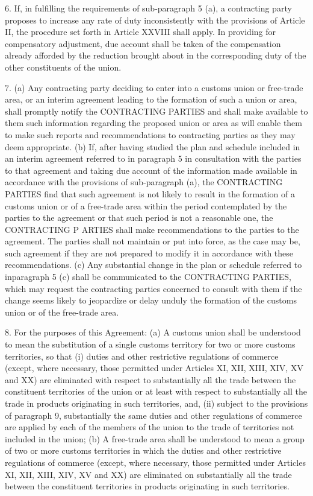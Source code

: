 \documentclass{nuevotema}
\begin{document}
6. If, in fulfilling the requirements of sub-paragraph 5 (a), a
contracting party proposes to increase any rate of duty inconsistently with
the provisions of Article II, the procedure set forth in Article XXVIII shall
apply. In providing for compensatory adjustment, due account shall be
taken of the compensation already afforded by the reduction brought
about in the corresponding duty of the other constituents of the union.

7. (a) Any contracting party deciding to enter into a customs
union or free-trade area, or an interim agreement leading to the formation
of such a union or area, shall promptly notify the CONTRACTING PARTIES
and shall make available to them such information regarding the
proposed union or area as will enable them to make such reports and
recommendations to contracting parties as they may deem appropriate.
(b) If, after having studied the plan and schedule included in an
interim agreement referred to in paragraph 5 in consultation with the
parties to that agreement and taking due account of the information made available in accordance with the provisions of sub-paragraph (a), the CONTRACTING PARTIES find that such agreement is not likely to result in the formation of a customs union or of a free-trade area within the period contemplated by the parties to the agreement or that such period is not a reasonable one, the CONTRACTING P ARTIES shall make recommendations to the parties to the agreement. The parties shall not maintain or put into force, as the case may be, such agreement if they are not prepared to modify it in
accordance with these recommendations. (c) Any substantial change in the plan or schedule referred to inparagraph 5 (c) shall be communicated to the CONTRACTING PARTIES, which may request the contracting parties concerned to consult with them if the change seems likely to jeopardize or delay unduly the formation of the customs union or of the free-trade area.

8.
For the purposes of this Agreement:
(a) A customs union shall be understood to mean the substitution of
a single customs territory for two or more customs territories, so
that (i) duties and other restrictive regulations of commerce (except,
where necessary, those permitted under Articles XI, XII, XIII,
XIV, XV and XX) are eliminated with respect to substantially
all the trade between the constituent territories of the union
or at least with respect to substantially all the trade in
products originating in such territories, and, (ii) subject to the provisions of paragraph 9, substantially the
same duties and other regulations of commerce are applied
by each of the members of the union to the trade of
territories not included in the union;
(b) A free-trade area shall be understood to mean a group of two or
more customs territories in which the duties and other restrictive
regulations of commerce (except, where necessary, those
permitted under Articles XI, XII, XIII, XIV, XV and XX) are
eliminated on substantially all the trade between the constituent
territories in products originating in such territories.
\end{document}
